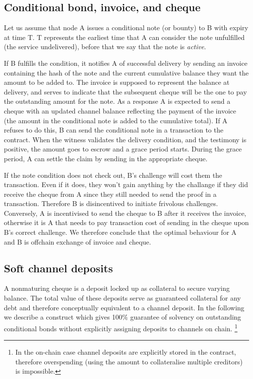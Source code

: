 \documentclass[a4paper,10pt]{article}
\begin{document}

\subsection{Conditional bond, invoice, and cheque}

Let us assume that node A issues a conditional note (or bounty) to B with expiry at time T.
T represents the earliest time that A can consider the note unfulfilled (the service undelivered), before
that we say that the note is \emph{active}.

If B fulfills the condition, it notifies A of successful delivery
by sending an \gls{invoice} containing the hash of the note and the current cumulative balance they want the
amount to be added to. The invoice is supposed to represent the balance at delivery, and serves to
indicate that the subsequent cheque will be the one to pay the outstanding amount for the note.
As a response A is expected to send a cheque with an updated channel balance reflecting the
payment of the invoice (the amount in the conditional note is added to the cumulative total).
If A refuses to do this, B can send the conditional note in a transaction
to  the contract. When the witness validates the delivery condition, and the testimony is
positive, the amount goes to escrow and a grace period starts.
During the grace period, A can settle the claim by sending in the appropriate cheque.

If the note condition does not check out, B's challenge will cost them the transaction.
Even if it does, they won't gain anything by the challange if they did receive the
cheque from A since they still needed to send the proof in a transaction.
Therefore B is disincentived to initiate frivolous challenges.
Conversely, A is incentivised to send the cheque to B after it receives the invoice,
otherwise it is A that needs to pay transaction cost of sending in the cheque upon B's correct challenge.
We therefore conclude that the optimal behaviour for A and B is offchain exchange of invoice and cheque.

\subsection{Soft channel deposits}
A nonmaturing cheque is a deposit locked up as collateral to secure varying balance.
The total value of these deposits serve as guaranteed collateral for any debt and
therefore conceptually equivalent to a channel deposit.
In the following we describe a construct which gives 100$\%$ guarantee of solvency
on outstanding conditional bonds without explicitly assigning deposits to channels on chain.%
%
\footnote{In the on-chain case channel deposits are explicitly stored in the contract, therefore overspending
(using the amount to collateralise multiple creditors) is impossible.}
\end{document}
